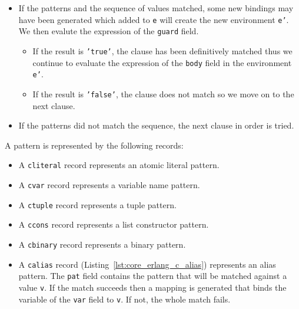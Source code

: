 \begin{itemize}
  \item If the patterns and the sequence of values matched, some new bindings
    may have been generated which added to \texttt{e} will create the new
    environment \texttt{e'}. We then evalute the expression of the
    \texttt{guard} field. 
    \begin{itemize}
      \item If the result is \texttt{'true'}, the clause has been definitively
        matched thus we continue to evaluate the expression of the
        \texttt{body} field in the environment \texttt{e'}.
      \item If the result is \texttt{'false'}, the clause does not match so we
        move on to the next clause.
    \end{itemize}
  \item If the patterns did not match the sequence, the next clause in order is
    tried.
\end{itemize}

A pattern is represented by the following records:

\begin{itemize}
  \item A \texttt{c\textunderscore literal} record represents an atomic literal pattern.
  \item A \texttt{c\textunderscore var} record represents a variable name pattern.
  \item A \texttt{c\textunderscore tuple} record represents a tuple pattern.
  \item A \texttt{c\textunderscore cons} record represents a list constructor pattern.
  \item A \texttt{c\textunderscore binary} record represents a binary pattern.
  \item A \texttt{c\textunderscore alias} record (Listing~\ref{lst:core_erlang_c_alias}) represents an alias pattern.
    The \texttt{pat} field contains the pattern that will be matched against a
    value \texttt{v}. If the match succeeds then a mapping is generated that
    binds the variable of the \texttt{var} field to \texttt{v}. If not, the
    whole match fails.
\end{itemize}




